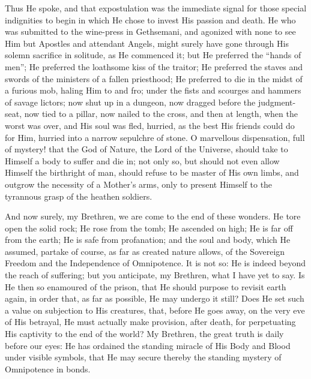 Thus He spoke, and that expostulation was the
immediate signal for those special indignities to begin
in which He chose to invest His passion and death. He who
was submitted to the wine-press in Gethsemani, and
agonized with none to see Him but Apostles and attendant
Angels, might surely have gone through His solemn
sacrifice in solitude, as He commenced it; but He
preferred the ``hands of men''; He preferred the
loathsome kiss of the traitor; He preferred the staves
and swords of the ministers of a fallen priesthood; He
preferred to die in the midst of a furious mob, haling
Him to and fro; under the fists and scourges and hammers
of savage lictors; now shut up in a dungeon, now dragged
before the judgment-seat, now tied to a pillar, now
nailed to the cross, and then at length, when the worst
was over, and His soul was fled, hurried, as the best His
friends could do for Him, hurried into a narrow sepulchre
of stone. O marvellous dispensation, full of mystery!
that the God of Nature, the Lord of the Universe, should
take to Himself a body to suffer and die in; not only so,
but should not even allow Himself the birthright of man,
should refuse to be master of His own limbs, and outgrow
the necessity of a Mother's arms, only to present Himself
to the tyrannous grasp of the heathen soldiers.

And now surely, my Brethren, we are come to the end of
these wonders. He tore open the solid rock; He rose from
the tomb; He ascended on high; He is far off from the
earth; He is safe from profanation; and the soul and
body, which He assumed, partake of course, as far as
created nature allows, of the Sovereign Freedom and the
Independence of Omnipotence. It is not so: He is indeed
beyond the reach of suffering; but you anticipate, my
Brethren, what I have yet to say. Is He then so enamoured
of the prison, that He should purpose to revisit earth
again, in order that, as far as possible, He may undergo
it still? Does He set such a value on subjection to His
creatures, that, before He goes away, on the very eve of
His betrayal, He must actually make provision, after
death, for perpetuating His captivity to the end of the
world? My Brethren, the great truth is daily before our
eyes: He has ordained the standing miracle of His Body
and Blood under visible symbols, that He may secure
thereby the standing mystery of Omnipotence in bonds.

